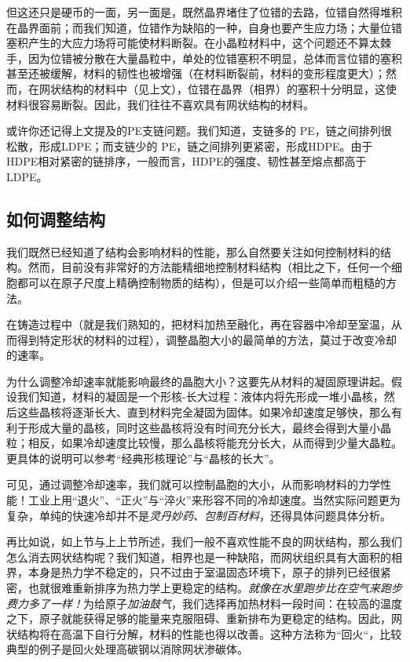 但这还只是硬币的一面，另一面是，既然晶界堵住了位错的去路，位错自然得堆积在晶界面前；而我们知道，位错作为缺陷的一种，自身也要产生应力场；大量位错塞积产生的大应力场将可能使材料断裂。在小晶粒材料中，这个问题还不算太棘手，因为位错被分散在大量晶粒中，单处的位错塞积不明显，总体而言位错的塞积甚至还被缓解，材料的韧性也被增强（在材料断裂前，材料的变形程度更大）；然而，在网状结构的材料中（见上文），位错在晶界（相界）的塞积十分明显，这使材料很容易断裂。因此，我们往往不喜欢具有网状结构的材料。

或许你还记得上文提及的PE支链问题。我们知道，支链多的 PE，链之间排列很松散，形成LDPE；而支链少的 PE，链之间排列更紧密，形成HDPE。由于HDPE相对紧密的链排序，一般而言，HDPE的强度、韧性甚至熔点都高于LDPE。

\subsection{如何调整结构}

我们既然已经知道了结构会影响材料的性能，那么自然要关注如何控制材料的结构。然而，目前没有非常好的方法能精细地控制材料结构（相比之下，任何一个细胞都可以在原子尺度上精确控制物质的结构），但是可以介绍一些简单而粗糙的方法。

在铸造过程中（就是我们熟知的，把材料加热至融化，再在容器中冷却至室温，从而得到特定形状的材料的过程），调整晶胞大小的最简单的方法，莫过于改变冷却的速率。

为什么调整冷却速率就能影响最终的晶胞大小？这要先从材料的凝固原理讲起。假设我们知道，材料的凝固是一个形核-长大过程：液体内将先形成一堆小晶核，然后这些晶核将逐渐长大、直到材料完全凝固为固体。如果冷却速度足够快，那么有利于形成大量的晶核，同时这些晶核将没有时间充分长大，最终会得到大量小晶粒；相反，如果冷却速度比较慢，那么晶核将能充分长大，从而得到少量大晶粒。更具体的说明可以参考“经典形核理论”与“晶核的长大”。

可见，通过调整冷却速率，我们就可以控制晶胞的大小，从而影响材料的力学性能！工业上用“退火”、“正火”与“淬火”来形容不同的冷却速度。当然实际问题更为复杂，单纯的快速冷却并不是\textsl{灵丹妙药、包制百材料}，还得具体问题具体分析。

再比如说，如上节与上上节所述，我们一般不喜欢性能不良的网状结构，那么我们怎么消去网状结构呢？我们知道，相界也是一种缺陷，而网状组织具有大面积的相界，本身是热力学不稳定的，只不过由于室温固态环境下，原子的排列已经很紧密，也就很难重新排序为热力学上更稳定的结构。\textsl{就像在水里跑步比在空气来跑步费力多了一样！}为给原子\textsl{加油鼓气}，我们选择再加热材料一段时间：在较高的温度之下，原子就能获得足够的能量来克服阻碍、重新排布为更稳定的结构。因此，网状结构将在高温下自行分解，材料的性能也得以改善。这种方法称为“回火“，比较典型的例子是回火处理高碳钢以消除网状渗碳体。

